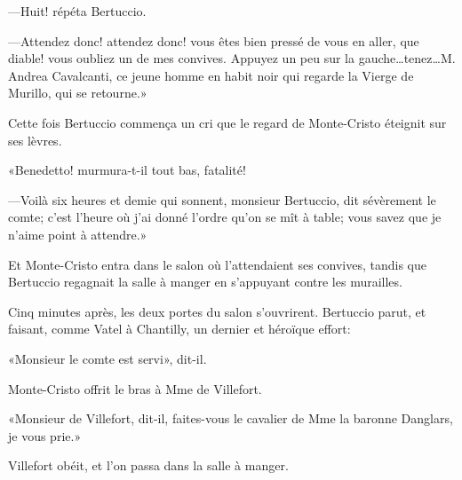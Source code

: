 —Huit! répéta Bertuccio. 

—Attendez donc! attendez donc! vous êtes bien pressé de vous en aller, que diable! vous oubliez un de mes convives. Appuyez un peu sur la gauche\dots tenez\dots M. Andrea Cavalcanti, ce jeune homme en habit noir qui regarde la Vierge de Murillo, qui se retourne.» 

Cette fois Bertuccio commença un cri que le regard de Monte-Cristo éteignit sur ses lèvres. 

«Benedetto! murmura-t-il tout bas, fatalité! 

—Voilà six heures et demie qui sonnent, monsieur Bertuccio, dit sévèrement le comte; c'est l'heure où j'ai donné l'ordre qu'on se mît à table; vous savez que je n'aime point à attendre.» 

Et Monte-Cristo entra dans le salon où l'attendaient ses convives, tandis que Bertuccio regagnait la salle à manger en s'appuyant contre les murailles. 

Cinq minutes après, les deux portes du salon s'ouvrirent. Bertuccio parut, et faisant, comme Vatel à Chantilly, un dernier et héroïque effort: 

«Monsieur le comte est servi», dit-il. 

Monte-Cristo offrit le bras à Mme de Villefort. 

«Monsieur de Villefort, dit-il, faites-vous le cavalier de Mme la baronne Danglars, je vous prie.» 

Villefort obéit, et l'on passa dans la salle à manger. 